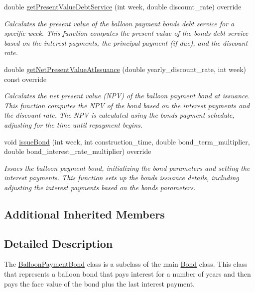 \begin{DoxyCompactItemize}
double \mbox{\hyperlink{classBalloonPaymentBond_ae038863f7a3408c2c8cd503d8e789f2d}{get\+Present\+Value\+Debt\+Service}} (int week, double discount\+\_\+rate) override
\begin{DoxyCompactList}\small\item\em Calculates the present value of the balloon payment bond\textquotesingle{}s debt service for a specific week. This function computes the present value of the bond\textquotesingle{}s debt service based on the interest payments, the principal payment (if due), and the discount rate. \end{DoxyCompactList}\item 
double \mbox{\hyperlink{classBalloonPaymentBond_abbfaae70e003f057ec842d3889138345}{get\+Net\+Present\+Value\+At\+Issuance}} (double yearly\+\_\+discount\+\_\+rate, int week) const override
\begin{DoxyCompactList}\small\item\em Calculates the net present value (N\+PV) of the balloon payment bond at issuance. This function computes the N\+PV of the bond based on the interest payments and the discount rate. The N\+PV is calculated using the bond\textquotesingle{}s payment schedule, adjusting for the time until repayment begins. \end{DoxyCompactList}\item 
void \mbox{\hyperlink{classBalloonPaymentBond_af22552acd74b08dbb1d308cc5e45344c}{issue\+Bond}} (int week, int construction\+\_\+time, double bond\+\_\+term\+\_\+multiplier, double bond\+\_\+interest\+\_\+rate\+\_\+multiplier) override
\begin{DoxyCompactList}\small\item\em Issues the balloon payment bond, initializing the bond parameters and setting the interest payments. This function sets up the bond\textquotesingle{}s issuance details, including adjusting the interest payments based on the bond\textquotesingle{}s parameters. \end{DoxyCompactList}\end{DoxyCompactItemize}
\subsection*{Additional Inherited Members}


\subsection{Detailed Description}
The {\ttfamily \mbox{\hyperlink{classBalloonPaymentBond}{Balloon\+Payment\+Bond}}} class is a subclass of the main {\ttfamily \mbox{\hyperlink{classBond}{Bond}}} class. This class that represents a balloon bond that pays interest for a number of years and then pays the face value of the bond plus the last interest payment. 

